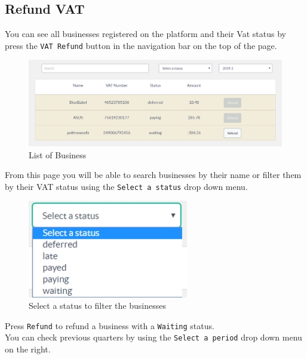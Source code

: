 	\subsection{Refund VAT}
	You can see all businesses registered on the platform and their Vat status by
	press the \texttt{VAT Refund} button in the navigation bar on the top of 
	the page. 
	\begin{figure}[H]
		\includegraphics[width=15cm]{res/images/business_list.png}
		\centering
		\caption{List of Business}
	\end{figure}
	\noindent From this page you will be able to search businesses by their name
	or filter them by their VAT	status using the \texttt{Select a status} drop 
	down menu.
	\begin{figure}[H]
		\includegraphics[width=7cm]{res/images/vat_status_select.png}
		\centering
		\caption{Select a status to filter the businesses}
	\end{figure}
	\noindent Press \texttt{Refund} to refund a business with a \texttt{Waiting}
	 status.\\
	You can check previous quarters by using the \texttt{Select a period}
	drop down menu on the right.
